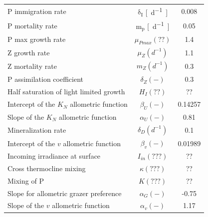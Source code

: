 \begin{table}[H]
\begin{tabular}{lcc}
P immigration rate                          & $\mathrm{\delta_I}$ \si{[d^{-1}]}               & 0.008     \\
P mortality rate                            & $\mathrm{m_p}$ \si{[d^{-1}]}                 & 0.05      \\
P max growth rate                           & $\mu_{Pmax} (??)$                 & 1.4       \\
Z growth rate                               & $\mu_Z (d^{-1})$                  & 1.1       \\
Z mortality rate                            & $m_Z (d^{-1})$                    & 0.3       \\
P assimilation coefficient                  & $\delta_Z (-)$                    & 0.3       \\
Half saturation of light limited growth     & $H_I (??)$                        & ??        \\
Intercept of the $K_N$ allometric function  & $\beta_U (-)$                     & 0.14257   \\
Slope of the $K_N$ allometric function      & $\alpha_U (-)$                    & 0.81      \\
Mineralization rate                         & $\delta_D (d^{-1})$               & 0.1       \\
Intercept of the $v$ allometric function    & $\beta_v (-)$                     & 0.01989   \\
Incoming irradiance at surface              & $I_{in} (???)$                    & ??        \\
Cross thermocline mixing                    & $\kappa (???)$                    & ??        \\
Mixing of P                                 & $K (???)$                         & ??        \\
Slope for allometric grazer preference      & $\alpha_G (-)$                    & -0.75     \\
Slope of the $v$ allometric function        & $\alpha_v (-)$                    & 1.17      \\
\hline
\end{tabular}
\end{table}

